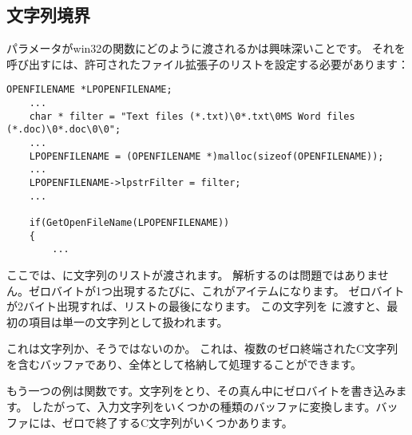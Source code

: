 ﻿\subsection{文字列境界}

パラメータがwin32の関数にどのように渡されるかは興味深いことです。 
それを呼び出すには、許可されたファイル拡張子のリストを設定する必要があります：

\begin{lstlisting}[style=customc]
	OPENFILENAME *LPOPENFILENAME;
	...
	char * filter = "Text files (*.txt)\0*.txt\0MS Word files (*.doc)\0*.doc\0\0";
	...
	LPOPENFILENAME = (OPENFILENAME *)malloc(sizeof(OPENFILENAME));
	...
	LPOPENFILENAME->lpstrFilter = filter;
	...

	if(GetOpenFileName(LPOPENFILENAME))
	{
		...
\end{lstlisting}

ここでは、に文字列のリストが渡されます。 
解析するのは問題ではありません。ゼロバイトが1つ出現するたびに、これがアイテムになります。 
ゼロバイトが2バイト出現すれば、リストの最後になります。 
この文字列を \printf に渡すと、最初の項目は単一の文字列として扱われます。

これは文字列か、そうではないのか。
これは、複数のゼロ終端されたC文字列を含むバッファであり、全体として格納して処理することができます。

もう一つの例は関数です。文字列をとり、その真ん中にゼロバイトを書き込みます。 
したがって、入力文字列をいくつかの種類のバッファに変換します。バッファには、ゼロで終了するC文字列がいくつかあります。
